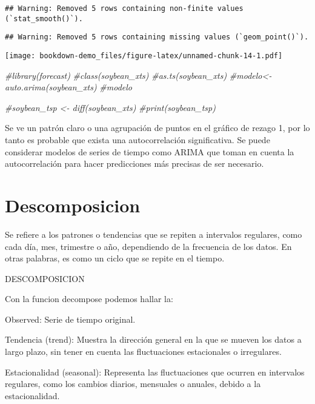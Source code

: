 \documentclass[
]{book}
\newenvironment{Shaded}{\begin{snugshade}}{\end{snugshade}}
\newcommand{\CommentTok}[1]{\textcolor[rgb]{0.56,0.35,0.01}{\textit{#1}}}
\begin{document}
\begin{verbatim}
## Warning: Removed 5 rows containing non-finite values (`stat_smooth()`).
\end{verbatim}

\begin{verbatim}
## Warning: Removed 5 rows containing missing values (`geom_point()`).
\end{verbatim}

\texttt{[image: bookdown-demo\_files/figure-latex/unnamed-chunk-14-1.pdf]}

\begin{Shaded}
\begin{Highlighting}[]
\CommentTok{\#library(forecast)}
\CommentTok{\#class(soybean\_xts) }
\CommentTok{\#as.ts(soybean\_xts)}
\CommentTok{\#modelo\textless{}{-}auto.arima(soybean\_xts)}
\CommentTok{\#modelo}

 \CommentTok{\#soybean\_tsp \textless{}{-} diff(soybean\_xts)}
\CommentTok{\#print(soybean\_tsp)}
\end{Highlighting}
\end{Shaded}

Se ve un patrón claro o una agrupación de puntos en el gráfico de rezago 1, por lo tanto es probable que exista una autocorrelación significativa. Se puede considerar modelos de series de tiempo como ARIMA que toman en cuenta la autocorrelación para hacer predicciones más precisas de ser necesario.

\hypertarget{descomposicion}{%
\chapter{Descomposicion}\label{descomposicion}}

Se refiere a los patrones o tendencias que se repiten a intervalos regulares, como cada día, mes, trimestre o año, dependiendo de la frecuencia de los datos. En otras palabras, es como un ciclo que se repite en el tiempo.

DESCOMPOSICION

Con la funcion decompose podemos hallar la:

Observed: Serie de tiempo original.

Tendencia (trend): Muestra la dirección general en la que se mueven los datos a largo plazo, sin tener en cuenta las fluctuaciones estacionales o irregulares.

Estacionalidad (seasonal): Representa las fluctuaciones que ocurren en intervalos regulares, como los cambios diarios, mensuales o anuales, debido a la estacionalidad.
\end{document}
